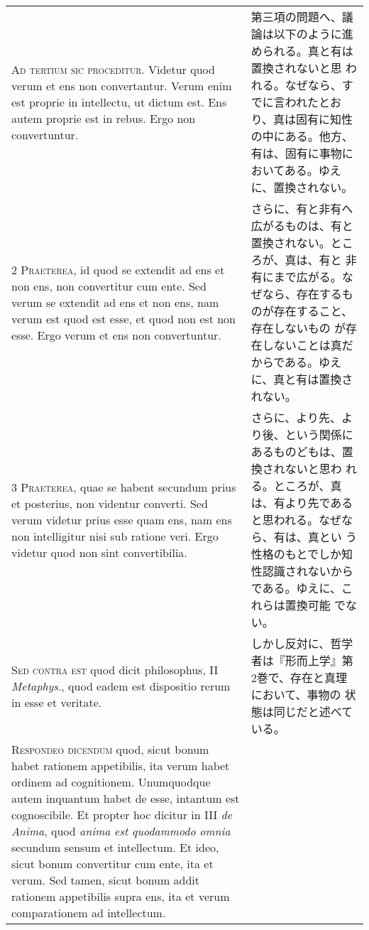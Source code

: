 \documentclass[10pt]{jsarticle} %
\begin{document}
\begin{longtable}{p{21em}p{21em}}

{\huge A}{\scshape d tertium sic proceditur}. Videtur quod verum et
ens non convertantur. Verum enim est proprie in intellectu, ut dictum
est. Ens autem proprie est in rebus. Ergo non convertuntur.

&

第三項の問題へ、議論は以下のように進められる。真と有は置換されないと思
われる。なぜなら、すでに言われたとおり、真は固有に知性の中にある。他方、
有は、固有に事物においてある。ゆえに、置換されない。

\\

{\scshape 2 Praeterea}, id quod se extendit ad ens et non ens, non
 convertitur cum ente. Sed verum se extendit ad ens et non ens, nam
 verum est quod est esse, et quod non est non esse. Ergo verum et ens
 non convertuntur.


&

さらに、有と非有へ広がるものは、有と置換されない。ところが、真は、有と
非有にまで広がる。なぜなら、存在するものが存在すること、存在しないもの
が存在しないことは真だからである。ゆえに、真と有は置換されない。

\\

{\scshape 3 Praeterea}, quae se habent secundum prius et posterius,
 non videntur converti. Sed verum videtur prius esse quam ens, nam ens
 non intelligitur nisi sub ratione veri. Ergo videtur quod non sint
 convertibilia.

&

さらに、より先、より後、という関係にあるものどもは、置換されないと思わ
れる。ところが、真は、有より先であると思われる。なぜなら、有は、真とい
う性格のもとでしか知性認識されないからである。ゆえに、これらは置換可能
でない。

\\


{\scshape Sed contra est} quod dicit philosophus, II {\itshape
 Metaphys}., quod eadem est dispositio rerum in esse et veritate.


&

しかし反対に、哲学者は『形而上学』第2巻で、存在と真理において、事物の
状態は同じだと述べている。

\\


{\scshape Respondeo dicendum} quod, sicut bonum habet rationem
 appetibilis, ita verum habet ordinem ad cognitionem. Unumquodque
 autem inquantum habet de esse, intantum est cognoscibile. Et propter
 hoc dicitur in III {\itshape de Anima}, quod {\itshape anima est
 quodammodo omnia} secundum sensum et intellectum. Et ideo, sicut
 bonum convertitur cum ente, ita et verum. Sed tamen, sicut bonum
 addit rationem appetibilis supra ens, ita et verum comparationem ad
 intellectum.



\end{longtable}
\end{document}
